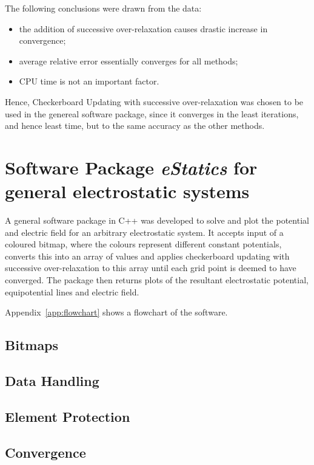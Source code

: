 \documentclass[11pt, a4paper]{article}
\begin{document}
The following conclusions were drawn from the data:
%
\begin{itemize}
\item the addition of successive over-relaxation causes drastic increase in convergence;
\item average relative error essentially converges for all methods;
\item CPU time is not an important factor.
\end{itemize}


Hence, Checkerboard Updating with successive over-relaxation was chosen to be used
in the genereal software package, since it converges in the least iterations,
and hence least time, but to the same accuracy as the other methods.

\section{Software Package \emph{eStatics} for general electrostatic systems}

A general software package in C++ was developed to solve and plot the potential and
electric field for an arbitrary electrostatic system. It accepts input of a coloured
bitmap, where the colours represent different constant potentials, converts this into
an array of values and applies checkerboard updating with successive over-relaxation
to this array until each grid point is deemed to have converged. The package then
returns plots of the resultant electrostatic potential, equipotential lines and electric
field.

Appendix~\ref{app:flowchart} shows a flowchart of the software.

\subsection{Bitmaps}


\subsection{Data Handling}


\subsection{Element Protection}
\label{sec:mask}


\subsection{Convergence}

\end{document}
